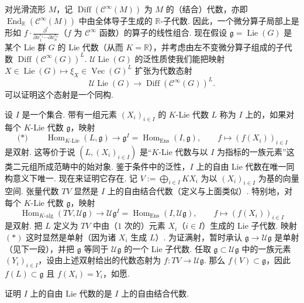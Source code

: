 \begin{numpara}[泛包络代数与微分算子]\label{np:ssl-2-2-2}
对光滑流形 $M$，记 $\operatorname{Diff}(\mathcal{C}^{\infty}(M))$ 为 $M$ 的（结合）代数，亦即 $\operatorname{End}_{\mathbb{R}}(\mathcal{C}^{\infty}(M))$ 中由全体导子生成的 $\mathbb{R}$-子代数. 因此，一个微分算子局部上是形如 $f \cdot \frac{\partial^{r}}{\partial x_{1}^{r_{1}} \cdots \partial x_{n}^{r_{n}}}$（$f$ 为 $\mathcal{C}^{\infty}$ 函数）的算子的线性组合.
现在假设 $\mathfrak g = \operatorname{Lie}(G)$ 是某个 Lie 群 $G$ 的 Lie 代数（从而 $K = \mathbb{R}$），并考虑由左不变微分算子组成的子代数 $\operatorname{Diff}(\mathcal{C}^{\infty}(G))^{L}$. $\mathcal{U}\operatorname{Lie}(G)$ 的泛性质使我们能把映射 $X \in \operatorname{Lie}(G) \mapsto \xi_{X} \in \operatorname{Vec}(G)^{L}$ 扩张为代数态射
\[\mathcal{U}\operatorname{Lie}(G) \longrightarrow \operatorname{Diff}(\mathcal{C}^{\infty}(G))^{L}.\]
可以证明这个态射是一个同构.
\end{numpara}

\begin{numpara}[自由 Lie 代数]\label{np:ssl-2-2-3}
设 $I$ 是一个集合. 带有一组元素 $(X_{i})_{i \in I}$ 的 $K$-Lie 代数 $L$ 称为 $I$ 上的，如果对每个 $K$-Lie 代数 $\mathfrak g$，映射
\[\text{($*$)}\qquad \operatorname{Hom}_{K\text{-Lie}}(L, \mathfrak g) \longrightarrow \mathfrak g^{I} = \operatorname{Hom}_{\mathrm{Ens}}(I, \mathfrak g),\qquad f \longmapsto (f(X_{i}))_{i \in I}\]
是双射. 这等价于说 $(L, (X_{i})_{i \in I})$ 是``$K$-Lie 代数与以 $I$ 为指标的一族元素''这类二元组所成范畴中的始对象. 鉴于条件中的泛性，$I$ 上的自由 Lie 代数在唯一同构意义下唯一.
现在来证明它存在. 记 $V := \bigoplus_{i \in I} K X_{i}$ 为以 $(X_{i})_{i \in I}$ 为基的向量空间. 张量代数 $TV$ 显然是 $I$ 上的自由结合代数（定义与上面类似）. 特别地，对每个 $K$-Lie 代数 $\mathfrak g$，映射
\[\operatorname{Hom}_{K\text{-alg}}(TV, \mathcal{U}\mathfrak g) \longrightarrow \mathcal{U}\mathfrak g^{I} = \operatorname{Hom}_{\mathrm{Ens}}(I, \mathcal{U}\mathfrak g),\qquad f \longmapsto (f(X_{i}))_{i \in I}\]
是双射. 把 $L$ 定义为 $TV$ 中由（$1$ 次的）元素 $X_{i}$（$i \in I$）生成的 Lie 子代数. 映射 $(*)$ 这时显然是单射（因为诸 $X_{i}$ 生成 $L$）. 为证满射，暂时承认 $\mathfrak g \longrightarrow \mathcal{U}\mathfrak g$ 是单射（见下一段），并把 $\mathfrak g$ 等同于 $\mathcal{U}\mathfrak g$ 的一个 Lie 子代数. 任取 $\mathfrak g \subset \mathcal{U}\mathfrak g$ 中的一族元素 $(Y_{i})_{i \in I}$，设由上述双射给出的代数态射为 $f : TV \longrightarrow \mathcal{U}\mathfrak g$. 那么 $f(V) \subset \mathfrak g$，因此 $f(L) \subset \mathfrak g$ 且 $f(X_{i}) = Y_{i}$，如愿.
\end{numpara}
\begin{exercise*}
证明 $I$ 上的自由 Lie 代数的是 $I$ 上的自由结合代数.
\end{exercise*}


